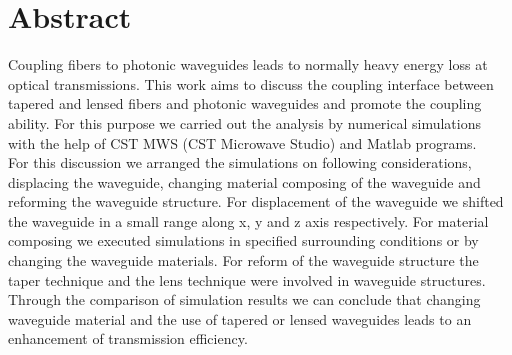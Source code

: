 \chapter*{Abstract}
\label{cha:kurzfassung}
Coupling fibers to photonic waveguides leads to normally heavy energy loss at optical transmissions. This work aims to discuss the coupling interface between tapered and lensed fibers and photonic waveguides and promote the coupling ability. For this purpose we carried out the analysis by numerical simulations with the help of CST MWS (CST Microwave Studio\textregistered) and Matlab programs. \\

For this discussion we arranged the simulations on following considerations, displacing the waveguide, changing material composing of the waveguide and reforming the waveguide structure. For displacement of the waveguide we shifted the waveguide in a small range along x, y and z axis respectively. For material composing we executed simulations in specified surrounding conditions or by changing the waveguide materials. For reform of the waveguide structure the taper technique and the lens technique were involved in waveguide structures. \\

Through the comparison of simulation results we can conclude that changing waveguide material and the use of tapered or lensed waveguides leads to an enhancement of transmission efficiency.
